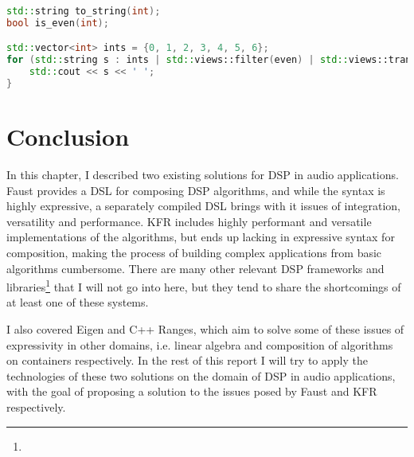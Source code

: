 \begin{lstlisting}[language=c++,caption={Example of composition of views. Prints "0 2 4 6". Implementations of supporting functions omitted.}, label=rangesviewsex]
std::string to_string(int);
bool is_even(int);

std::vector<int> ints = {0, 1, 2, 3, 4, 5, 6};
for (std::string s : ints | std::views::filter(even) | std::views::transform(to_string)) {
    std::cout << s << ' ';
}
\end{lstlisting}

\section{Conclusion}

In this chapter, I described two existing solutions for DSP in audio applications. Faust provides a DSL for composing DSP algorithms, and while the syntax is highly expressive, a separately compiled DSL brings with it issues of integration, versatility and performance. KFR includes highly performant and versatile implementations of the algorithms, but ends up lacking in expressive syntax for composition, making the process of building complex applications from basic algorithms cumbersome. There are many other relevant DSP frameworks and libraries\footnote{} that I will not go into here, but they tend to share the shortcomings of at least one of these systems.

I also covered Eigen and C++ Ranges, which aim to solve some of these issues of expressivity in other domains, i.e. linear algebra and composition of algorithms on containers respectively. In the rest of this report I will try to apply the technologies of these two solutions on the domain of DSP in audio applications, with the goal of proposing a solution to the issues posed by Faust and KFR respectively.